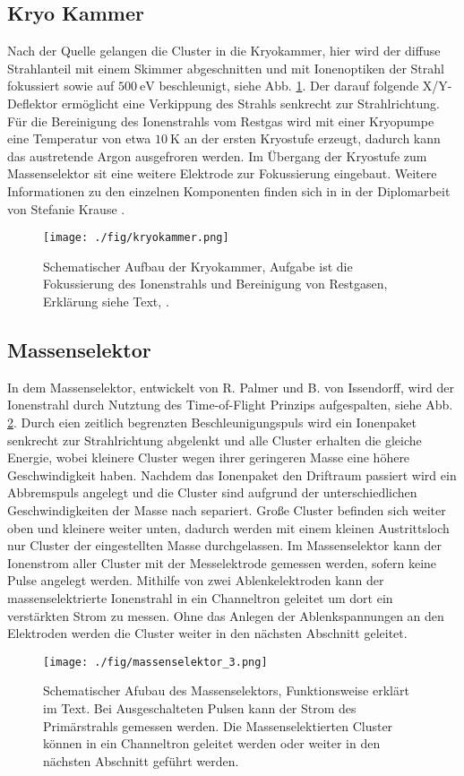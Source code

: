 \subsection{Kryo Kammer}
Nach der Quelle gelangen die Cluster in die Kryokammer, hier wird der diffuse Strahlanteil mit einem Skimmer abgeschnitten und mit Ionenoptiken der Strahl fokussiert sowie auf $\SI{500}{\eV}$ beschleunigt, siehe Abb. \ref{fig:kryokammer}.
Der darauf folgende X/Y-Deflektor ermöglicht eine Verkippung des Strahls senkrecht zur Strahlrichtung.
Für die Bereinigung des Ionenstrahls vom Restgas wird mit einer Kryopumpe eine Temperatur von etwa $\SI{10}{\kelvin}$ \cite[S. 27]{woltermaster} an der ersten Kryostufe erzeugt, dadurch kann das austretende Argon ausgefroren werden.
Im Übergang der Kryostufe zum Massenselektor sit eine weitere Elektrode zur Fokussierung eingebaut.
Weitere Informationen zu den einzelnen Komponenten finden sich in in der Diplomarbeit von Stefanie Krause \cite{krause}.
\begin{figure}
    \centering
    \texttt{[image: ./fig/kryokammer.png]}
    \caption{Schematischer Aufbau der Kryokammer, Aufgabe ist die Fokussierung des Ionenstrahls und Bereinigung von Restgasen, Erklärung siehe Text, \cite{woltermaster}.}
    \label{fig:kryokammer}
\end{figure}
\subsection{Massenselektor}
In dem Massenselektor, entwickelt von R. Palmer und B. von Issendorff\cite{Issendorff.1999}, wird der Ionenstrahl durch Nutztung des Time-of-Flight Prinzips aufgespalten, siehe Abb. \ref{fig:mschtr}.
Durch eien zeitlich begrenzten Beschleunigungspuls wird ein Ionenpaket senkrecht zur Strahlrichtung abgelenkt und alle Cluster erhalten die gleiche Energie, wobei kleinere Cluster wegen ihrer geringeren Masse eine höhere Geschwindigkeit haben.
Nachdem das Ionenpaket den Driftraum passiert wird ein Abbremspuls angelegt und die Cluster sind aufgrund der unterschiedlichen Geschwindigkeiten der Masse nach separiert.
Große Cluster befinden sich weiter oben und kleinere weiter unten, dadurch werden mit einem kleinen Austrittsloch nur Cluster der eingestellten Masse durchgelassen.
Im Massenselektor kann der Ionenstrom aller Cluster mit der Messelektrode gemessen werden, sofern keine Pulse angelegt werden.
Mithilfe von zwei Ablenkelektroden kann der massenselektrierte Ionenstrahl in ein Channeltron geleitet um dort ein verstärkten Strom zu messen.
Ohne das Anlegen der Ablenkspannungen an den Elektroden werden die Cluster weiter in den nächsten Abschnitt geleitet.
\begin{figure}
    \centering
    \texttt{[image: ./fig/massenselektor\_3.png]}
    \caption{Schematischer Afubau des Massenselektors, Funktionsweise erklärt im Text. Bei Ausgeschalteten Pulsen kann der Strom des Primärstrahls gemessen werden. Die Massenselektierten Cluster können in ein Channeltron geleitet werden oder weiter in den nächsten Abschnitt geführt werden.}
    \label{fig:mschtr}
\end{figure}

